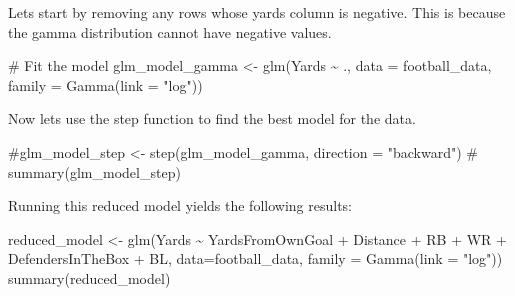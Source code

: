 \documentclass[
  super,
  preprint,
  3p]{elsarticle}
\newenvironment{Shaded}{\begin{snugshade}}{\end{snugshade}}
\newcommand{\AttributeTok}[1]{\textcolor[rgb]{0.40,0.45,0.13}{#1}}
\newcommand{\CommentTok}[1]{\textcolor[rgb]{0.37,0.37,0.37}{#1}}
\newcommand{\DecValTok}[1]{\textcolor[rgb]{0.68,0.00,0.00}{#1}}
\newcommand{\FloatTok}[1]{\textcolor[rgb]{0.68,0.00,0.00}{#1}}
\newcommand{\FunctionTok}[1]{\textcolor[rgb]{0.28,0.35,0.67}{#1}}
\newcommand{\NormalTok}[1]{\textcolor[rgb]{0.00,0.23,0.31}{#1}}
\newcommand{\OtherTok}[1]{\textcolor[rgb]{0.00,0.23,0.31}{#1}}
\newcommand{\SpecialCharTok}[1]{\textcolor[rgb]{0.37,0.37,0.37}{#1}}
\newcommand{\StringTok}[1]{\textcolor[rgb]{0.13,0.47,0.30}{#1}}
\begin{document}
Lets start by removing any rows whose yards column is negative. This is
because the gamma distribution cannot have negative values.

\begin{Shaded}
\end{Shaded}

\begin{Shaded}
\begin{Highlighting}[]
\CommentTok{\# Fit the model}
\NormalTok{glm\_model\_gamma }\OtherTok{\textless{}{-}} \FunctionTok{glm}\NormalTok{(Yards }\SpecialCharTok{\textasciitilde{}}\NormalTok{ ., }\AttributeTok{data =}\NormalTok{ football\_data, }\AttributeTok{family =} \FunctionTok{Gamma}\NormalTok{(}\AttributeTok{link =} \StringTok{"log"}\NormalTok{))}
\end{Highlighting}
\end{Shaded}

Now lets use the step function to find the best model for the data.

\begin{Shaded}
\begin{Highlighting}[]
\CommentTok{\#glm\_model\_step \textless{}{-} step(glm\_model\_gamma, direction = "backward")}
\CommentTok{\# summary(glm\_model\_step)}
\end{Highlighting}
\end{Shaded}

Running this reduced model yields the following results:

\begin{Shaded}
\begin{Highlighting}[]
\NormalTok{reduced\_model }\OtherTok{\textless{}{-}} \FunctionTok{glm}\NormalTok{(Yards }\SpecialCharTok{\textasciitilde{}}\NormalTok{ YardsFromOwnGoal }\SpecialCharTok{+}\NormalTok{ Distance }\SpecialCharTok{+}\NormalTok{ RB }\SpecialCharTok{+}\NormalTok{ WR }\SpecialCharTok{+}\NormalTok{ DefendersInTheBox }\SpecialCharTok{+}\NormalTok{ BL, }\AttributeTok{data=}\NormalTok{football\_data, }\AttributeTok{family =} \FunctionTok{Gamma}\NormalTok{(}\AttributeTok{link =} \StringTok{"log"}\NormalTok{))}
\FunctionTok{summary}\NormalTok{(reduced\_model)}
\end{Highlighting}
\end{Shaded}
\end{document}
